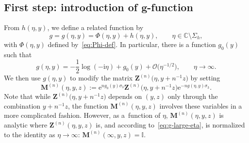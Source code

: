 \documentclass[pdftex]{sigma}
\numberwithin{equation}{section}
\begin{document}
\subsection[First step: introduction of g-function]{First step: introduction of $\boldsymbol{g}$-function}
From $h(\eta,y)$, we define a related function by
\begin{equation*}
g=g(\eta,y)=\Phi(\eta,y)+h(\eta,y),\qquad \eta\in\mathbb{C}\setminus\Sigma_h,
\end{equation*}
with $\Phi(\eta,y)$ defined by~\eqref{eq:Phi-def}. In particular,
there is a function $g_0(y)$ such that
\begin{equation}
g(\eta,y)=-\frac{1}{2}\log(-\mathrm{i}\eta) + g_0(y)+\mathcal{O}\bigl(\eta^{-1/2}\bigr),\qquad\eta\to\infty.
\label{eq:g-large-eta}
\end{equation}
We then use $g(\eta,y)$ to modify the matrix $\mathbf{Z}^{(n)}\bigl(\eta,y+n^{-1}z\bigr)$ by setting
\begin{equation}
\mathbf{M}^{(n)}(\eta,y,z):=\mathrm{e}^{ng_0(y)\sigma_3}\mathbf{Z}^{(n)}\bigl(\eta,y+n^{-1}z\bigr)\mathrm{e}^{-ng(\eta,y)\sigma_3}.
\label{eq:MZ}
\end{equation}
Note that while $\mathbf{Z}^{(n)}\bigl(\eta,y+n^{-1}z\bigr)$ depends on $(y,z)$ only through the
combination $y+n^{-1}z$, the function $\mathbf{M}^{(n)}(\eta,y,z)$ involves these
variables in a more complicated fashion. However, as a~function of $\eta$,
$\mathbf{M}^{(n)}(\eta,y,z)$ is analytic where $\mathbf{Z}^{(n)}(\eta,y,z)$ is, and
according to~\eqref{eq:g-large-eta}, is normalized to the identity as
$\eta\to\infty$: $\mathbf{M}^{(n)}(\infty,y,z)=\mathbb{I}$.
\end{document}
